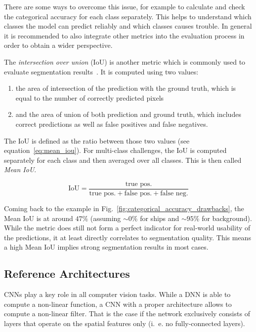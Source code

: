 There are some ways to overcome this issue, for example to calculate and check the categorical accuracy for each class separately. This helps to understand which classes the model can predict reliably and which classes causes trouble. In general it is recommended to also integrate other metrics into the evaluation process in order to obtain a wider perspective.

The \emph{intersection over union} (IoU) is another metric which is commonly used to evaluate segmentation results~\cite{pascal_voc15}. It is computed using two values:
\begin{enumerate}
    \item the area of intersection of the prediction with the ground truth, which is equal to the number of correctly predicted pixels
    \item and the area of union of both prediction and ground truth, which includes correct predictions as well as false positives and false negatives.
\end{enumerate}

The IoU is defined as the ratio between those two values (see equation~\ref{eq:mean_iou}). For multi-class challenges, the IoU is computed separately for each class and then averaged over all classes. This is then called \emph{Mean IoU}.

\begin{equation}
    \label{eq:mean_iou}
    \text{IoU} = \frac{\text{true pos.}}{\text{true pos.}+\text{false pos.}+\text{false neg.}}
\end{equation}

Coming back to the example in Fig.~\ref{fig:categorical_accuracy_drawbacks}, the Mean IoU is at around $47\%$ (assuming $\sim 0\%$ for ships and $\sim 95\%$ for background). While the metric does still not form a perfect indicator for real-world usability of the predictions, it at least directly correlates to segmentation quality. This means a high Mean IoU implies strong segmentation results in most cases.

\subsection{Reference Architectures}
\label{sec:ref_archs}
CNNs play a key role in all computer vision tasks. While a DNN is able to compute a non-linear function, a CNN with a proper architecture allows to compute a non-linear filter. That is the case if the network exclusively consists of layers that operate on the spatial features only (i.~e. no fully-connected layers).


